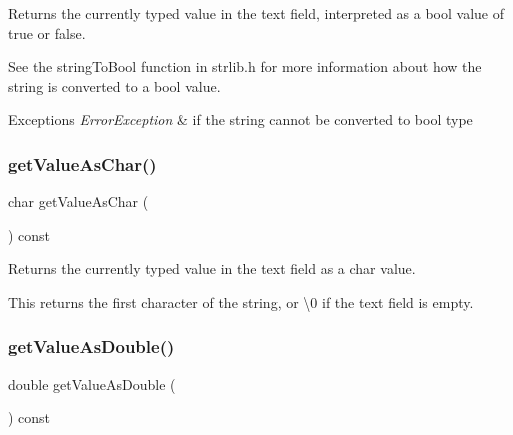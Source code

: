 Returns the currently typed value in the text field, interpreted as a bool value of true or false. 

See the string\+To\+Bool function in strlib.\+h for more information about how the string is converted to a bool value. 
\begin{DoxyExceptions}{Exceptions}
{\em Error\+Exception} & if the string cannot be converted to bool type \\
\hline
\end{DoxyExceptions}
\mbox{\label{classsgl_1_1GTextField_a562f514fc055aaa37ca3145fc7abde8e}} 
\subsubsection{\texorpdfstring{get\+Value\+As\+Char()}{getValueAsChar()}}
{\footnotesize\ttfamily char get\+Value\+As\+Char (\begin{DoxyParamCaption}{ }\end{DoxyParamCaption}) const\hspace{0.3cm}{\ttfamily [virtual]}}



Returns the currently typed value in the text field as a char value. 

This returns the first character of the string, or \textquotesingle{}\textbackslash{}0\textquotesingle{} if the text field is empty. \mbox{\label{classsgl_1_1GTextField_aab9a19edbd1548d557721e0b695295f8}} 
\subsubsection{\texorpdfstring{get\+Value\+As\+Double()}{getValueAsDouble()}}
{\footnotesize\ttfamily double get\+Value\+As\+Double (\begin{DoxyParamCaption}{ }\end{DoxyParamCaption}) const\hspace{0.3cm}{\ttfamily [virtual]}}



